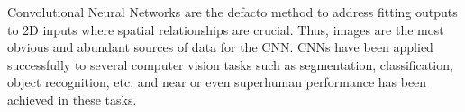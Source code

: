 Convolutional Neural Networks are the defacto method to address fitting outputs to 2D inputs where spatial relationships are crucial. Thus, images are the most obvious and abundant sources of data for the CNN. CNNs have been applied successfully to several computer vision tasks such as segmentation, classification, object recognition, etc. and near or even superhuman performance has been achieved in these tasks.







 



















 



















 



 






